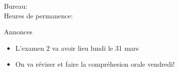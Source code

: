 \documentclass{beamer}
\subtitle[Passé composé et imparfait]{Le passé composé contre l'imparfait (suite)}
\begin{document}
  \begin{frame}
    \titlepage
    \tiny{Bureau: \\
          Heures de permanence: }
  \end{frame}

  \begin{frame}{Annonces}
    \begin{itemize}
      \item L'examen 2 va avoir lieu lundi le 31 mars
      \item On va réviser et faire \alert{la compréhesion orale} vendredi!
    \end{itemize}
  \end{frame}

\end{document}
